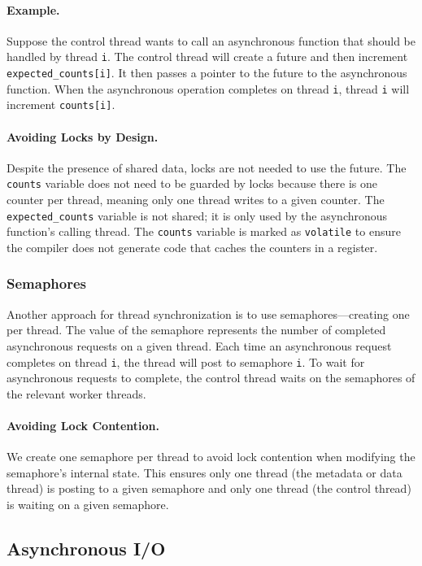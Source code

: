 \paragraph{Example.}
Suppose the control thread wants to call an asynchronous function that should
be handled by thread {\tt i}. The control thread will create a future and then
increment {\tt expected\_counts[i]}. It then passes a pointer to the future to
the asynchronous function. When the asynchronous operation completes on thread
{\tt i}, thread {\tt i} will increment {\tt counts[i]}.

\paragraph{Avoiding Locks by Design.}
Despite the presence of shared data, locks are not needed to use the future.
The {\tt counts} variable does not need to be guarded by locks because there is
one counter per thread, meaning only one thread writes to a given counter. The
{\tt expected\_counts} variable is not shared; it is only used by the
asynchronous function's calling thread. The {\tt counts} variable is marked
as {\tt volatile} to ensure the compiler does not generate code that caches the
counters in a register.

\subsubsection{Semaphores}
Another approach for thread synchronization is to use semaphores---creating one
per thread. The value of the semaphore represents the number of completed
asynchronous requests on a given thread. Each time an asynchronous request
completes on thread {\tt i}, the thread will post to semaphore {\tt i}. To wait
for asynchronous requests to complete, the control thread waits on the
semaphores of the relevant worker threads.

\paragraph{Avoiding Lock Contention.} We create one semaphore per thread to
avoid lock contention when modifying the semaphore's internal state. This
ensures only one thread (the metadata or data thread) is posting to a given
semaphore and only one thread (the control thread) is waiting on a given
semaphore.

\subsection{Asynchronous I/O}
